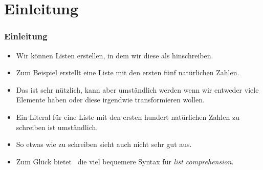 \documentclass[aspectratio=169,mathserif,notheorems]{beamer}%
\subtitle{35.~List Comprehension}%
\begin{document}
%
%
\startPresentation%
%
\section{Einleitung}%
\begin{frame}%
\frametitle{Einleitung}%
\begin{itemize}%
%
\item Wir können Listen erstellen, in dem wir diese als  hinschreiben.%
%
\item<2-> Zum Beispiel erstellt \pythonil{[1, 2, 3, 4, 5]} eine Liste mit den ersten fünf natürlichen Zahlen.%
%
\item<3-> Das ist sehr nützlich, kann aber umständlich werden wenn wir entweder viele Elemente haben oder diese irgendwie transformieren wollen.%
%
\item<4-> Ein Literal für eine Liste mit den ersten hundert natürlichen Zahlen zu schreiben ist umständlich.%
%
\item<5-> So etwas wie  zu schreiben sieht auch nicht sehr gut aus.%
%
\item<6-> Zum Glück bietet \python\ die viel bequemere Syntax für \emph{list comprehension}.%
%
\end{itemize}%
\end{frame}%
%
\end{document}
